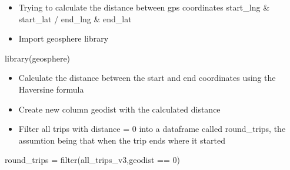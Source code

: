 \documentclass[
]{article}
\newenvironment{Shaded}{\begin{snugshade}}{\end{snugshade}}
\newcommand{\AttributeTok}[1]{\textcolor[rgb]{0.77,0.63,0.00}{#1}}
\newcommand{\DecValTok}[1]{\textcolor[rgb]{0.00,0.00,0.81}{#1}}
\newcommand{\FunctionTok}[1]{\textcolor[rgb]{0.00,0.00,0.00}{#1}}
\newcommand{\NormalTok}[1]{#1}
\newcommand{\OtherTok}[1]{\textcolor[rgb]{0.56,0.35,0.01}{#1}}
\newcommand{\SpecialCharTok}[1]{\textcolor[rgb]{0.00,0.00,0.00}{#1}}
\providecommand{\tightlist}{%
  \setlength{\itemsep}{0pt}\setlength{\parskip}{0pt}}
\begin{document}
\fontsize{10}{12}
\selectfont

\begin{itemize}
\tightlist
\item
  Trying to calculate the distance between gps coordinates start\_lng \&
  start\_lat / end\_lng \& end\_lat
\item
  Import geosphere library
\end{itemize}

\fontsize{9}{11}
\selectfont

\begin{Shaded}
\begin{Highlighting}[]
\FunctionTok{library}\NormalTok{(geosphere) }
\end{Highlighting}
\end{Shaded}

\fontsize{10}{12}
\selectfont

\begin{itemize}
\tightlist
\item
  Calculate the distance between the start and end coordinates using the
  Haversine formula
\item
  Create new column geodist with the calculated distance
\end{itemize}

\fontsize{9}{11}
\selectfont

\begin{Shaded}
\end{Shaded}

\fontsize{10}{12}
\selectfont

\begin{itemize}
\tightlist
\item
  Filter all trips with distance = 0 into a dataframe called
  round\_trips, the assumtion being that when the trip ends where it
  started
\end{itemize}

\fontsize{9}{11}
\selectfont

\begin{Shaded}
\begin{Highlighting}[]
\NormalTok{round\_trips }\OtherTok{=} \FunctionTok{filter}\NormalTok{(all\_trips\_v3,geodist }\SpecialCharTok{==} \DecValTok{0}\NormalTok{)}
\end{Highlighting}
\end{Shaded}
\end{document}
